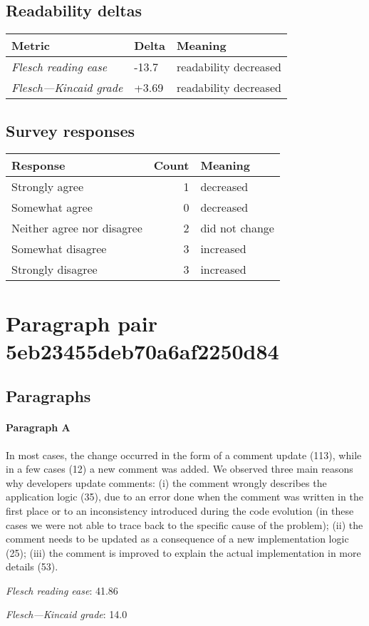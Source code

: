 \subsection{Readability deltas}

\begin{tabular}{lll}
\toprule
               \textbf{Metric} & \textbf{Delta} &       \textbf{Meaning} \\
\midrule
    \emph{Flesch reading ease} &          -13.7 &  readability decreased \\
 \emph{Flesch---Kincaid grade} &          +3.69 &  readability decreased \\
\bottomrule
\end{tabular}

\subsection{Survey responses}
\begin{tabular}{lrl}
\toprule
          \textbf{Response} &  \textbf{Count} & \textbf{Meaning} \\
\midrule
             Strongly agree &               1 &        decreased \\
             Somewhat agree &               0 &        decreased \\
 Neither agree nor disagree &               2 &   did not change \\
          Somewhat disagree &               3 &        increased \\
          Strongly disagree &               3 &        increased \\
\bottomrule
\end{tabular}

\section{Paragraph pair 5eb23455deb70a6af2250d84}
\subsection{Paragraphs}
\paragraph{Paragraph A}
In most cases, the change occurred in the form of a comment update (113), while in a few cases (12) a new comment was added. We observed three main reasons why developers update comments: (i) the comment wrongly describes the application logic (35), due to an error done when the comment was written in the first place or to an inconsistency introduced during the code evolution (in these cases we were not able to trace back to the specific cause of the problem); (ii) the comment needs to be updated as a consequence of a new implementation logic (25); (iii) the comment is improved to explain the actual implementation in more details (53).\par\medskip
\emph{Flesch reading ease}: 41.86\par
\emph{Flesch---Kincaid grade}: 14.0


